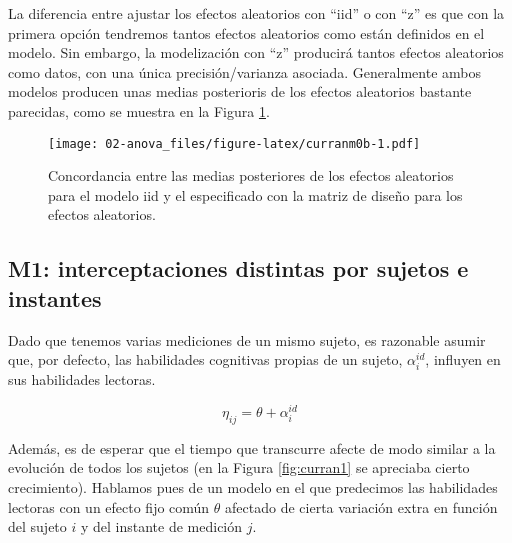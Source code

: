\documentclass[
]{book}
\newenvironment{Shaded}{\begin{snugshade}}{\end{snugshade}}
\newcommand{\AttributeTok}[1]{\textcolor[rgb]{0.77,0.63,0.00}{#1}}
\newcommand{\CommentTok}[1]{\textcolor[rgb]{0.56,0.35,0.01}{\textit{#1}}}
\newcommand{\FunctionTok}[1]{\textcolor[rgb]{0.00,0.00,0.00}{#1}}
\newcommand{\NormalTok}[1]{#1}
\newcommand{\OtherTok}[1]{\textcolor[rgb]{0.56,0.35,0.01}{#1}}
\newcommand{\SpecialCharTok}[1]{\textcolor[rgb]{0.00,0.00,0.00}{#1}}
\newcommand{\StringTok}[1]{\textcolor[rgb]{0.31,0.60,0.02}{#1}}
\begin{document}
La diferencia entre ajustar los efectos aleatorios con ``iid'' o con ``z'' es que con la primera opción tendremos tantos efectos aleatorios como están definidos en el modelo. Sin embargo, la modelización con ``z'' producirá tantos efectos aleatorios como datos, con una única precisión/varianza asociada. Generalmente ambos modelos producen unas medias posterioris de los efectos aleatorios bastante parecidas, como se muestra en la Figura \ref{fig:curranm0b}.

\begin{Shaded}
\end{Shaded}

\begin{figure}
\centering
\texttt{[image: 02-anova\_files/figure-latex/curranm0b-1.pdf]}
\caption{\label{fig:curranm0b}Concordancia entre las medias posteriores de los efectos aleatorios para el modelo iid y el especificado con la matriz de diseño para los efectos aleatorios.}
\end{figure}

\hypertarget{m1-interceptaciones-distintas-por-sujetos-e-instantes}{%
\subsection{M1: interceptaciones distintas por sujetos e instantes}\label{m1-interceptaciones-distintas-por-sujetos-e-instantes}}

Dado que tenemos varias mediciones de un mismo sujeto, es razonable asumir que, por defecto, las habilidades cognitivas propias de un sujeto, \(\alpha_i^{id}\), influyen en sus habilidades lectoras.

\[\eta_{ij}=\theta + \alpha_i^{id}\]

Además, es de esperar que el tiempo que transcurre afecte de modo similar a la evolución de todos los sujetos (en la Figura \ref{fig:curran1} se apreciaba cierto crecimiento). Hablamos pues de un modelo en el que predecimos las habilidades lectoras con un efecto fijo común \(\theta\) afectado de cierta variación extra en función del sujeto \(i\) y del instante de medición \(j\).
\end{document}
